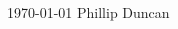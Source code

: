 \documentclass[11pt, letterpaper]{awesome-cv}
\begin{document}
\makecvheader

\makecvfooter
  {\today}
  {Phillip Duncan}
  {\thepage}



%  
%  
%  
\begin{multicols}{2}
  
  
%  
\end{multicols}
\end{document}
